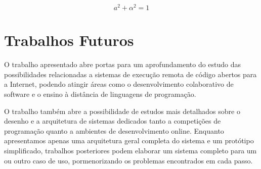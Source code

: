 \documentclass[ruledheader, 12pt]{abnt}
\begin{document}
\[ a^2 + \alpha^2 = 1 \]

\section{Trabalhos Futuros}

O trabalho apresentado abre portas para um aprofundamento do estudo das possibilidades relacionadas a sistemas de execução remota de código abertos para a Internet, podendo atingir áreas como o desenvolvimento colaborativo de software e o ensino à distância de linguagens de programação.

O trabalho também abre a possibilidade de estudos mais detalhados sobre o desenho e a arquitetura de sistemas dedicados tanto a competições de programação quanto a ambientes de desenvolvimento online. Enquanto apresentamos apenas uma arquitetura geral completa do sistema e um protótipo simplificado, trabalhos posteriores podem elaborar um sistema completo para um ou outro caso de uso, pormenorizando os problemas encontrados em cada passo.


\end{document}
